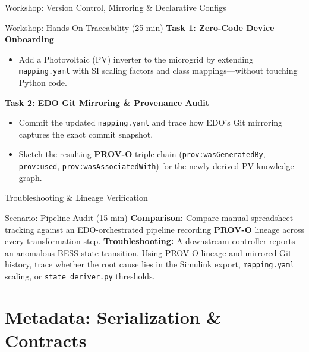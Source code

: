 \documentclass[aspectratio=169]{beamer}
\let\pause\relax
\begin{document}
\begin{frame}{Workshop: Version Control, Mirroring \& Declarative Configs}
    \begin{block}{Workshop: Hands-On Traceability (25 min)}
        \textbf{Task 1: Zero-Code Device Onboarding}
        \begin{itemize}
            \item Add a Photovoltaic (PV) inverter to the microgrid by extending \texttt{mapping.yaml} with SI scaling factors and class mappings—without touching Python code.
        \end{itemize}
        \pause
        \textbf{Task 2: EDO Git Mirroring \& Provenance Audit}
        \begin{itemize}
            \item Commit the updated \texttt{mapping.yaml} and trace how EDO's Git mirroring captures the exact commit snapshot.
            \item Sketch the resulting \textbf{PROV-O} triple chain (\texttt{prov:wasGeneratedBy}, \texttt{prov:used}, \texttt{prov:wasAssociatedWith}) for the newly derived PV knowledge graph.
        \end{itemize}
    \end{block}
\end{frame}

\begin{frame}{Troubleshooting \& Lineage Verification}
    \begin{block}{Scenario: Pipeline Audit (15 min)}
        \textbf{Comparison:} Compare manual spreadsheet tracking against an EDO-orchestrated pipeline recording \textbf{PROV-O} lineage across every transformation step.
        \pause
        \textbf{Troubleshooting:} A downstream controller reports an anomalous BESS state transition. Using PROV-O lineage and mirrored Git history, trace whether the root cause lies in the Simulink export, \texttt{mapping.yaml} scaling, or \texttt{state\_deriver.py} thresholds.
    \end{block}
\end{frame}

\section{Metadata: Serialization \& Contracts}
\end{document}
